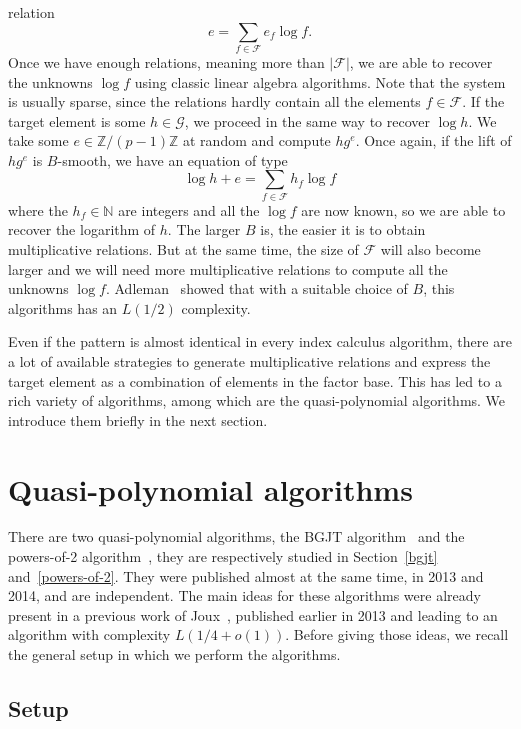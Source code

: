 \documentclass[a4paper,11pt]{article}
\theoremstyle{break}
\theoremstyle{sc}
\theoremstyle{definition}
\theoremstyle{remark}
\begin{document}
relation
\[
  e = \sum_{f\in\mathcal F} e_f\log f.
\]
Once we have enough relations, meaning more than $|\mathcal F|$, we are able to
recover the unknowns $\log f$ using classic linear algebra algorithms. Note that
the system is usually sparse, since the relations hardly contain all the
elements $f\in\mathcal F$. If the target element is some $h\in\mathcal G$, we
proceed in the same way to recover $\log h$. We take some
$e\in\mathbb{Z}/(p-1)\mathbb{Z}$ at random and compute $hg^e$. Once again, if
the lift of $hg^e$ is $B$-smooth, we have an equation of type
\[
  \log h + e = \sum_{f\in\mathcal F}h_f\log f
\]
where the $h_f\in\mathbb{N}$ are integers and all the $\log f$ are now known, so
we are able to recover the logarithm of $h$. The larger $B$ is, the easier it is
to obtain multiplicative relations. But at the same time, the size of $\mathcal
F$ will also become larger and we will need more multiplicative relations to
compute all the unknowns $\log f$. Adleman~\cite{Adleman79} showed that with a suitable choice of
$B$, this algorithms has an $L(1/2)$ complexity.

Even if the pattern is almost identical in every index calculus algorithm, there
are a lot of available strategies to generate multiplicative relations and
express the target element as a combination of elements in the factor base. This
has led to a rich variety of algorithms, among which are the quasi-polynomial
algorithms. We introduce them briefly in the next section.

\section{Quasi-polynomial algorithms}
\label{quasi-pol}

There are two quasi-polynomial algorithms, the BGJT algorithm~\cite{BGJT13} and
the powers-of-2 algorithm~\cite{GKZ14}, they are respectively studied in
Section~\ref{bgjt} and~\ref{powers-of-2}. They were published almost at the
same time, in 2013 and 2014, and are independent. 
The main ideas for these algorithms were already present in a
previous work of Joux~\cite{Joux13}, published earlier in 2013 and leading to
an algorithm with complexity $L(1/4 + o(1))$. Before giving those ideas, we
recall the general setup in which we perform the algorithms.

\subsection{Setup}
\label{general-setup}
\end{document}
